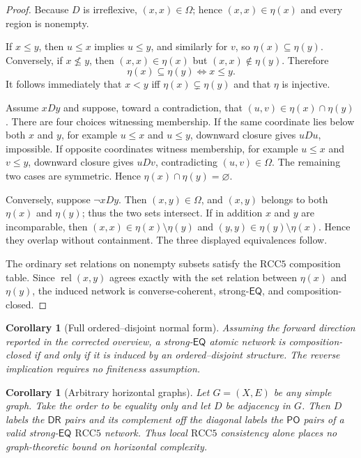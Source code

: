 \documentclass[11pt]{article}
\newtheorem{corollary}[theorem]{Corollary}
\theoremstyle{definition}
\theoremstyle{remark}
\newcommand{\RCC}{\mathrm{RCC5}}
\newcommand{\EQ}{\mathsf{EQ}}
\newcommand{\PO}{\mathsf{PO}}
\newcommand{\DR}{\mathsf{DR}}
\newcommand{\Rel}{\operatorname{rel}}
\begin{document}
\begin{proof}
Because $D$ is irreflexive, $(x,x)\in\Omega$; hence $(x,x)\in\eta(x)$ and every region is nonempty.

If $x\leq y$, then $u\leq x$ implies $u\leq y$, and similarly for $v$, so $\eta(x)\subseteq\eta(y)$.  Conversely, if $x\nleq y$, then $(x,x)\in\eta(x)$ but $(x,x)\notin\eta(y)$.  Therefore
\[
  \eta(x)\subseteq\eta(y)\iff x\leq y.
\]
It follows immediately that $x<y$ iff $\eta(x)\subsetneq\eta(y)$ and that $\eta$ is injective.

Assume $xDy$ and suppose, toward a contradiction, that $(u,v)\in\eta(x)\cap\eta(y)$.  There are four choices witnessing membership.  If the same coordinate lies below both $x$ and $y$, for example $u\leq x$ and $u\leq y$, downward closure gives $uDu$, impossible.  If opposite coordinates witness membership, for example $u\leq x$ and $v\leq y$, downward closure gives $uDv$, contradicting $(u,v)\in\Omega$.  The remaining two cases are symmetric.  Hence $\eta(x)\cap\eta(y)=\varnothing$.

Conversely, suppose $\neg xDy$.  Then $(x,y)\in\Omega$, and $(x,y)$ belongs to both $\eta(x)$ and $\eta(y)$; thus the two sets intersect.  If in addition $x$ and $y$ are incomparable, then $(x,x)\in\eta(x)\setminus\eta(y)$ and $(y,y)\in\eta(y)\setminus\eta(x)$.  Hence they overlap without containment.  The three displayed equivalences follow.

The ordinary set relations on nonempty subsets satisfy the $\RCC$ composition table.  Since $\Rel(x,y)$ agrees exactly with the set relation between $\eta(x)$ and $\eta(y)$, the induced network is converse-coherent, strong-$\EQ$, and composition-closed.
\end{proof}

\begin{corollary}[Full ordered--disjoint normal form]\label{cor:normal-form}
Assuming the forward direction reported in the corrected overview, a strong-$\EQ$ atomic network is composition-closed if and only if it is induced by an ordered--disjoint structure.  The reverse implication requires no finiteness assumption.
\end{corollary}

\begin{corollary}[Arbitrary horizontal graphs]\label{cor:graphs}
Let $G=(X,E)$ be any simple graph.  Take the order to be equality only and let $D$ be adjacency in $G$.  Then $D$ labels the $\DR$ pairs and its complement off the diagonal labels the $\PO$ pairs of a valid strong-$\EQ$ $\RCC$ network.  Thus local $\RCC$ consistency alone places no graph-theoretic bound on horizontal complexity.
\end{corollary}
\end{document}
